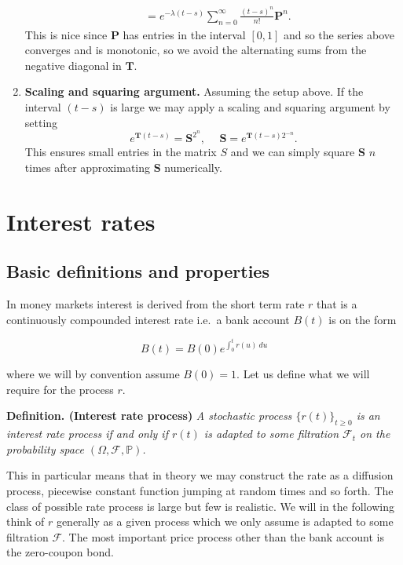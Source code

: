 \documentclass[a4paper,10pt,openany]{book}
\begin{document}
\begin{enumerate}
\begin{align*}
    &=e^{-\lambda (t-s)}\sum_{n=0}^\infty \frac{(t-s)^n}{n!}\mathbf{P}^n.
    \end{align*}
  This is nice since \(\mathbf P\) has entries in the interval \([0,1]\) and so the series above converges and is monotonic, so we avoid the alternating sums from the negative diagonal in \(\mathbf T\).
\item
  \textbf{Scaling and squaring argument.} Assuming the setup above. If the interval \((t-s)\) is large we may apply a scaling and squaring argument by setting
  \[
    e^{\mathbf T(t-s)}=\mathbf{S}^{2^n},\hspace{15pt}\mathbf{S}=e^{\mathbf T (t-s)2^{-n}}.
    \]
  This ensures small entries in the matrix \(S\) and we can simply square \(\mathbf S\) \(n\) times after approximating \(\mathbf S\) numerically.
\end{enumerate}

\hypertarget{interest-rates}{%
\section{Interest rates}\label{interest-rates}}

\hypertarget{basic-definitions-and-properties}{%
\subsection{Basic definitions and properties}\label{basic-definitions-and-properties}}

In money markets interest is derived from the short term rate \(r\) that is a continuously compounded interest rate i.e.~a bank account \(B(t)\) is on the form

\[
B(t)=B(0)e^{\int_0^tr(u)\ du}
\]

where we will by convention assume \(B(0)=1\). Let us define what we will require for the process \(r\).

\textbf{Definition. (Interest rate process)} \emph{A stochastic process \(\{r(t)\}_{t\ge 0}\) is an interest rate process if and only if \(r(t)\) is adapted to some filtration \(\mathcal F_t\) on the probability space \((\Omega,\mathcal F,\mathbb P)\).}

This in particular means that in theory we may construct the rate as a diffusion process, piecewise constant function jumping at random times and so forth. The class of possible rate process is large but few is realistic. We will in the following think of \(r\) generally as a given process which we only assume is adapted to some filtration \(\mathcal F\). The most important price process other than the bank account is the zero-coupon bond.
\end{document}
